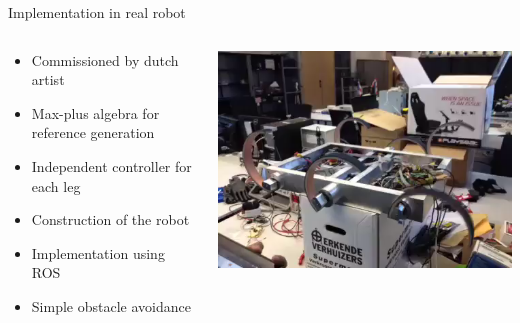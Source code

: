 \documentclass{beamer}
\begin{document}
\begin{frame}{Implementation in real robot}
	\begin{columns}
				\begin{column}{0.5\textwidth}
					\begin{itemize}
						\item Commissioned by dutch artist
						\item Max-plus algebra for reference generation
						\item Independent controller for each leg
						\item Construction of the robot
						\item Implementation using ROS
						\item Simple obstacle avoidance
					\end{itemize}
				\end{column}
				\begin{column}{0.5\textwidth}
					\includegraphics[height=0.7\textwidth]{real.png}
				\end{column}
	\end{columns}
\end{frame}

\end{document}
